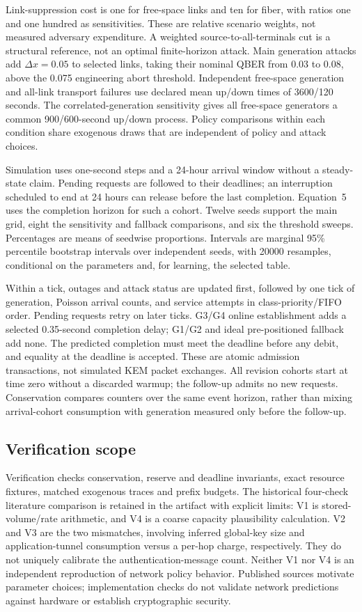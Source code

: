 \documentclass[conference,a4paper]{IEEEtran}
\begin{document}
Link-suppression cost is one for free-space links and ten for fiber, with ratios one and one hundred as sensitivities. These are relative scenario weights, not measured adversary expenditure. A weighted source-to-all-terminals cut is a structural reference, not an optimal finite-horizon attack. Main generation attacks add $\Delta x=0.05$ to selected links, taking their nominal QBER from 0.03 to 0.08, above the 0.075 engineering abort threshold. Independent free-space generation and all-link transport failures use declared mean up/down times of 3600/120 seconds. The correlated-generation sensitivity gives all free-space generators a common 900/600-second up/down process. Policy comparisons within each condition share exogenous draws that are independent of policy and attack choices.

Simulation uses one-second steps and a 24-hour arrival window without a steady-state claim. Pending requests are followed to their deadlines; an interruption scheduled to end at 24 hours can release before the last completion. Equation~5 uses the completion horizon for such a cohort. Twelve seeds support the main grid, eight the sensitivity and fallback comparisons, and six the threshold sweeps. Percentages are means of seedwise proportions. Intervals are marginal 95\% percentile bootstrap intervals over independent seeds, with 20000 resamples, conditional on the parameters and, for learning, the selected table.

Within a tick, outages and attack status are updated first, followed by one tick of generation, Poisson arrival counts, and service attempts in class-priority/FIFO order. Pending requests retry on later ticks. G3/G4 online establishment adds a selected 0.35-second completion delay; G1/G2 and ideal pre-positioned fallback add none. The predicted completion must meet the deadline before any debit, and equality at the deadline is accepted. These are atomic admission transactions, not simulated KEM packet exchanges. All revision cohorts start at time zero without a discarded warmup; the follow-up admits no new requests. Conservation compares counters over the same event horizon, rather than mixing arrival-cohort consumption with generation measured only before the follow-up.

\subsection{Verification scope}
Verification checks conservation, reserve and deadline invariants, exact resource fixtures, matched exogenous traces and prefix budgets. The historical four-check literature comparison is retained in the artifact with explicit limits: V1 is stored-volume/rate arithmetic, and V4 is a coarse capacity plausibility calculation. V2 and V3 are the two mismatches, involving inferred global-key size and application-tunnel consumption versus a per-hop charge, respectively. They do not uniquely calibrate the authentication-message count. Neither V1 nor V4 is an independent reproduction of network policy behavior. Published sources motivate parameter choices; implementation checks do not validate network predictions against hardware or establish cryptographic security.
\end{document}
